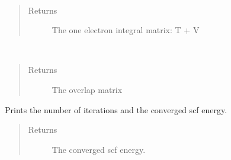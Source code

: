 \documentclass[letterpaper,10pt,english]{sphinxmanual}
\begin{document}
\begin{fulllineitems}
\begin{fulllineitems}
\label{\detokenize{RHF:ghf.RHF.RHF.get_one_e}}~\begin{quote}\begin{description}
\item[{Returns}] \leavevmode
The one electron integral matrix: T + V

\end{description}\end{quote}

\end{fulllineitems}


\begin{fulllineitems}
\label{\detokenize{RHF:ghf.RHF.RHF.get_ovlp}}~\begin{quote}\begin{description}
\item[{Returns}] \leavevmode
The overlap matrix

\end{description}\end{quote}

\end{fulllineitems}


\begin{fulllineitems}
\label{\detokenize{RHF:ghf.RHF.RHF.get_scf_solution}}
Prints the number of iterations and the converged scf energy.
\begin{quote}\begin{description}
\item[{Returns}] \leavevmode
The converged scf energy.

\end{description}\end{quote}

\end{fulllineitems}



\end{fulllineitems}
\end{document}
